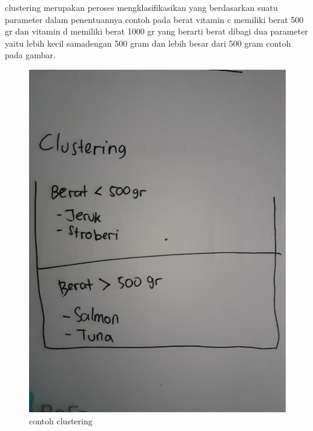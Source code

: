 \begin{enumerate}
		clustering merupakan peroses mengklasifikasikan yang berdasarkan suatu parameter dalam penentuannya contoh pada berat vitamin c memiliki berat 500 gr dan vitamin d memiliki berat 1000 gr yang berarti berat dibagi dua parameter yaitu lebih kecil samadengan 500 gram dan lebih besar dari 500 gram contoh pada gambar.\par
		\begin{figure}[ht]
			\centering
			\includegraphics[scale=0.01]{figures/1174043/chapter2/4.jpg}
			\caption{contoh clustering}
			\label{contoh}
		\end{figure}
		

\end{enumerate}
